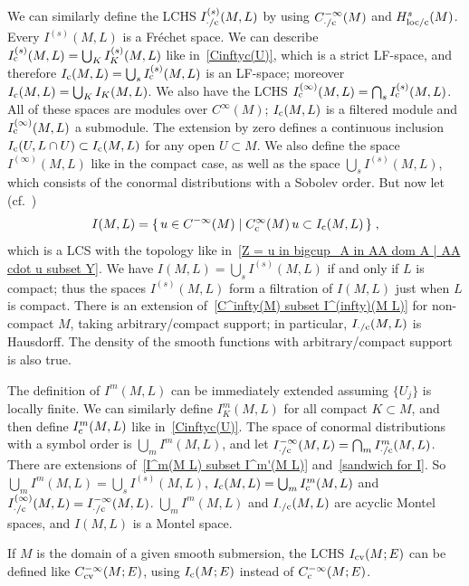 \documentclass{memo-l}
\theoremstyle{plain}
\theoremstyle{definition}
\theoremstyle{remark}
\newcommand{\co}{{\text{\rm c}}}
\newcommand{\cv}{{\text{\rm cv}}}
\newcommand{\Cinftyc}{C^\infty_{\text{\rm c}}}
\numberwithin{section}{chapter}
\numberwithin{equation}{section}%
\begin{document}
We can similarly define the LCHS $I^{(s)}_{{\cdot}/\co}(M,L)$ by using $C^{-\infty}_{{\cdot}/\co}(M)$ and $H^s_{\text{\rm loc/c}}(M)$. Every $I^{(s)}(M,L)$ is a Fr\'echet space. We can describe $I^{(s)}_\co(M,L)=\bigcup_KI^{(s)}_K(M,L)$ like in~\eqref{Cinftyc(U)}, which is a strict LF-space, and therefore $I_\co(M,L)=\bigcup_sI_\co^{(s)}(M,L)$ is an LF-space; moreover $I_\co(M,L)=\bigcup_KI_K(M,L)$. We also have the LCHS $I^{(\infty)}_\co(M,L)=\bigcap_sI_\co^{(s)}(M,L)$. All of these spaces are modules over $C^\infty(M)$; $I_\co(M,L)$ is a filtered module and $I^{(\infty)}_\co(M,L)$ a submodule. The extension by zero defines a continuous inclusion $I_\co(U,L\cap U)\subset I_\co(M,L)$ for any open $U\subset M$. We also define the space $I^{(\infty)}(M,L)$ like in the compact case, as well as the space $\bigcup_sI^{(s)}(M,L)$, which consists of the conormal distributions with a Sobolev order. But now let (cf.\ \cite[Definition~18.2.6]{Hormander1985-III})
\begin{equation}\label{I(M L) - non-compact M}
I(M,L)=\{\,u\in C^{-\infty}(M)\mid\Cinftyc(M)\,u\subset I_\co(M,L)\,\}\;,
\end{equation}
which is a LCS with the topology like in~\eqref{Z = u in bigcup_A in AA dom A | AA cdot u subset Y}. We have $I(M,L)=\bigcup_sI^{(s)}(M,L)$ if and only if $L$ is compact; thus the spaces $I^{(s)}(M,L)$ form a filtration of $I(M,L)$ just when $L$ is compact. There is an extension of~\eqref{C^infty(M) subset I^(infty)(M L)} for non-compact $M$, taking arbitrary/compact support; in particular, $I_{{\cdot}/\co}(M,L)$ is Hausdorff. The density of the smooth functions with arbitrary/compact support is also true.

The definition of $I^m(M,L)$ can be immediately extended assuming $\{U_j\}$ is locally finite. We can similarly define $I^m_K(M,L)$ for all compact $K\subset M$, and then define $I^m_\co(M,L)$ like in~\eqref{Cinftyc(U)}. The space of conormal distributions with a symbol order is $\bigcup_mI^m(M,L)$, and let $I^{-\infty}_{{\cdot}/\co}(M,L)=\bigcap_mI^m_{{\cdot}/\co}(M,L)$. There are extensions of~\eqref{I^m(M L) subset I^m'(M L)} and~\eqref{sandwich for I}. So $\bigcup_mI^m(M,L)=\bigcup_sI^{(s)}(M,L)$, $I_\co(M,L)=\bigcup_mI^m_\co(M,L)$ and $I^{(\infty)}_{{\cdot}/\co}(M,L)=I^{-\infty}_{{\cdot}/\co}(M,L)$. $\bigcup_mI^m(M,L)$ and $I_{{\cdot}/\co}(M,L)$ are acyclic Montel spaces, and $I(M,L)$ is a Montel space.

If $M$ is the domain of a given smooth submersion, the LCHS $I_\cv(M;E)$ can be defined like $C^{-\infty}_\cv(M;E)$, using $I_\co(M;E)$ instead of $C^{-\infty}_\co(M;E)$. \index{$I_\cv(M;E)$}
\end{document}
